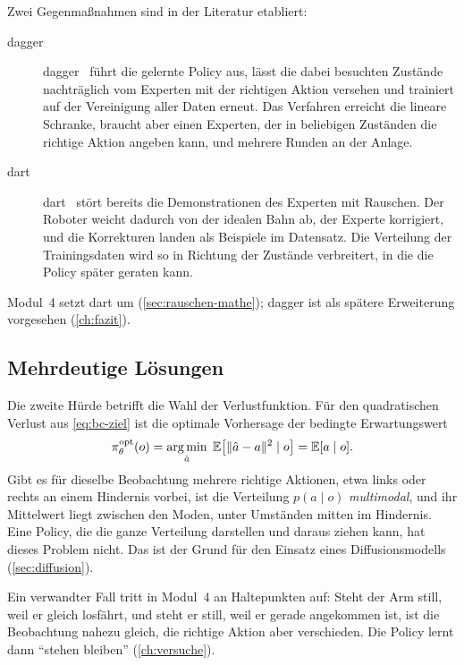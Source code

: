 Zwei Gegenmaßnahmen sind in der Literatur etabliert:
\begin{description}
  \item[\acs{dagger}] \ac{dagger}~\cite{ross2011} führt die gelernte Policy aus, lässt die
    dabei besuchten Zustände nachträglich vom Experten mit der richtigen Aktion versehen und
    trainiert auf der Vereinigung aller Daten erneut. Das Verfahren erreicht die lineare
    Schranke, braucht aber einen Experten, der in beliebigen Zuständen die richtige Aktion
    angeben kann, und mehrere Runden an der Anlage.
  \item[\acs{dart}] \ac{dart}~\cite{laskey2017} stört bereits die Demonstrationen des
    Experten mit Rauschen. Der Roboter weicht dadurch von der idealen Bahn ab, der Experte
    korrigiert, und die Korrekturen landen als Beispiele im Datensatz. Die Verteilung der
    Trainingsdaten wird so in Richtung der Zustände verbreitert, in die die Policy später
    geraten kann.
\end{description}
Modul~4 setzt \ac{dart} um (\cref{sec:rauschen-mathe}); \ac{dagger} ist als spätere
Erweiterung vorgesehen (\cref{ch:fazit}).

\subsection{Mehrdeutige Lösungen}
\label{sec:multimodal}

Die zweite Hürde betrifft die Wahl der Verlustfunktion. Für den quadratischen Verlust aus
\cref{eq:bc-ziel} ist die optimale Vorhersage der bedingte Erwartungswert
\begin{equation}
  \pi_\theta^{\mathrm{opt}}(o) = \operatorname*{arg\,min}_{\hat a}\; \mathbb{E}\bigl[\lVert \hat a - a\rVert^2 \mid o\bigr]
  = \mathbb{E}[a \mid o] .
  \label{eq:mittelwert}
\end{equation}
Gibt es für dieselbe Beobachtung mehrere richtige Aktionen, etwa links oder rechts an einem
Hindernis vorbei, ist die Verteilung $p(a \mid o)$ \emph{multimodal}, und ihr Mittelwert
liegt zwischen den Moden, unter Umständen mitten im Hindernis. Eine Policy, die die ganze
Verteilung darstellen und daraus ziehen kann, hat dieses Problem nicht. Das ist der Grund für
den Einsatz eines Diffusionsmodells (\cref{sec:diffusion}).

Ein verwandter Fall tritt in Modul~4 an Haltepunkten auf: Steht der Arm still, weil er
gleich losfährt, und steht er still, weil er gerade angekommen ist, ist die Beobachtung
nahezu gleich, die richtige Aktion aber verschieden. Die Policy lernt dann \enquote{stehen
bleiben} (\cref{ch:versuche}).

